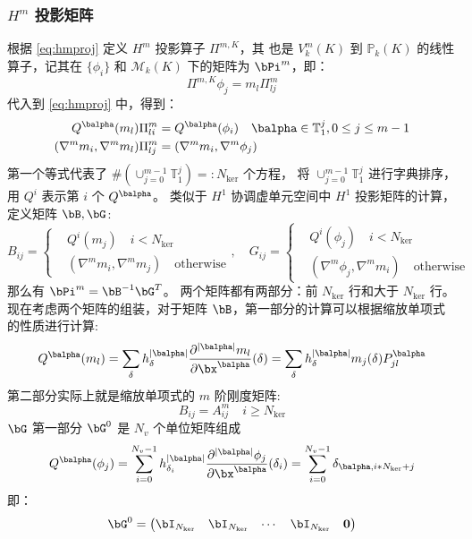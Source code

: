 \subsubsection{$H^m$ 投影矩阵}
根据 \eqref{eq:hmproj} 定义 $H^m$ 投影算子 $\Pi^{m, K}$，其
也是 $V_k^m(K)$ 到 $\mathbb{P}_k(K)$ 的线性算子，记其在 $\{\phi_i\}$ 和
$\mathcal{M}_{k}(K)$ 下的矩阵为 $\bPi^m$，即：
$$
\Pi^{m, K}\phi_j = m_l\Pi_{lj}^m
$$
代入到 \eqref{eq:hmproj} 中，得到：
\begin{equation}
\begin{aligned}
    Q^{\balpha}(m_l)\Pi^{m}_{li} & = Q^{\balpha}(\phi_i) \quad \balpha \in
    \mathbb{T}_{1}^j, 0\leq j \leq m-1\\
    (\nabla^m m_i, \nabla^m m_l) \Pi^m_{lj}& = (\nabla^m m_i, \nabla^m \phi_j)
\end{aligned}
\end{equation}
第一个等式代表了 $\#(\cup_{j=0}^{m-1} \mathbb{T}_{1}^j) =: N_{\ker}$ 个方程，
将 $\cup_{j=0}^{m-1} \mathbb{T}_{1}^j$ 进行字典排序，用 $Q^i$ 表示第 $i$ 个
$Q^{\balpha}$。
类似于 $H^1$ 协调虚单元空间中 $H^1$ 投影矩阵的计算，定义矩阵 $\bB, \bG$:
$$
B_{ij} = \left\{ 
\begin{aligned}
    & Q^i(m_j) \quad i < N_{\ker}\\
    & (\nabla^m m_i, \nabla^m m_{j}) \quad \text{otherwise}
\end{aligned}
\right., 
\quad
G_{ij} = \left\{
\begin{aligned}
    & Q^i(\phi_j) \quad i < N_{\ker}\\ 
    & (\nabla^m \phi_j, \nabla^m m_{i}) \quad \text{otherwise}
\end{aligned}
\right.
$$
那么有 $\bPi^m = \bB^{-1}\bG^T$。
两个矩阵都有两部分：前 $N_{\ker}$ 行和大于 $N_{\ker}$ 行。
现在考虑两个矩阵的组装，对于矩阵
$\bB$，第一部分的计算可以根据缩放单项式的性质进行计算:
$$
Q^{\balpha}(m_l) = \sum_{\delta} h_{\delta}^{|\balpha|}
\frac{\partial^{|\balpha|} m_l}{\partial \bx^{\balpha}}(\delta)
= \sum_{\delta} h_{\delta}^{|\balpha|} m_j(\delta)
P^{\balpha}_{jl} 
$$
第二部分实际上就是缩放单项式的 $m$ 阶刚度矩阵:
$$
B_{ij} = A_{ij}^m \quad i \geq N_{\ker}
$$
$\bG$ 第一部分 $\bG^0$ 是 $N_v$ 个单位矩阵组成
$$
Q^{\balpha}(\phi_j) = \sum_{i=0}^{N_v-1} h_{\delta_i}^{|\balpha|}
\frac{\partial^{|\balpha|} \phi_j}{\partial \bx^{\balpha}}(\delta_i)
= \sum_{i=0}^{N_v-1} \delta_{\balpha, i*N_{\mathrm{ker}} + j}
$$
即：
\begin{equation}
\bG^{0} = 
\begin{pmatrix}
    \bI_{N_{\ker}} & \bI_{N_{\ker}} & \cdots & \bI_{N_{\ker}} & \boldsymbol{0}\\
\end{pmatrix}
\end{equation}
